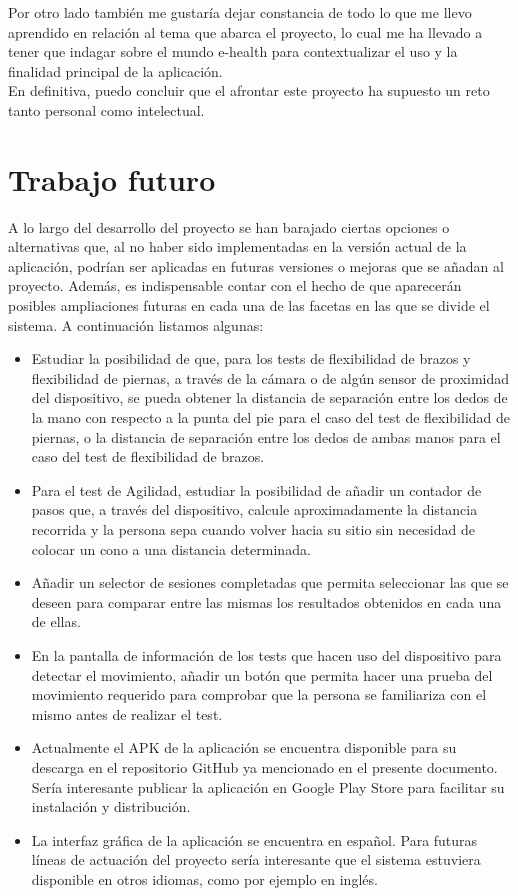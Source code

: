 Por otro lado también me gustaría dejar constancia de todo lo que me llevo aprendido en relación al tema que abarca el proyecto, lo cual me ha llevado a tener que indagar sobre el mundo e-health para contextualizar el uso y la finalidad principal de la aplicación.\\

En definitiva, puedo concluir que el afrontar este proyecto ha supuesto un reto tanto personal como intelectual.

\section{Trabajo futuro}

A lo largo del desarrollo del proyecto se han barajado ciertas opciones o alternativas que, al no haber sido implementadas en la versión actual de la aplicación, podrían ser aplicadas en futuras versiones o mejoras que se añadan al proyecto. Además, es indispensable contar con el hecho de que aparecerán posibles ampliaciones futuras en cada una de las facetas en las que se divide el sistema. A continuación listamos algunas:

\begin{itemize}
\item Estudiar la posibilidad de que, para los tests de flexibilidad de brazos y flexibilidad de piernas, a través de la cámara o de algún sensor de proximidad del dispositivo, se pueda obtener la distancia de separación entre los dedos de la mano con respecto a la punta del pie para el caso del test de flexibilidad de piernas, o la distancia de separación entre los dedos de ambas manos para el caso del test de flexibilidad de brazos.
\item Para el test de Agilidad, estudiar la posibilidad de añadir un contador de pasos que, a través del dispositivo, calcule aproximadamente la distancia recorrida y la persona sepa cuando volver hacia su sitio sin necesidad de colocar un cono a una distancia determinada.
\item Añadir un selector de sesiones completadas que permita seleccionar las que se deseen para comparar entre las mismas los resultados obtenidos en cada una de ellas.
\item En la pantalla de información de los tests que hacen uso del dispositivo para detectar el movimiento, añadir un botón que permita hacer una prueba del movimiento requerido para comprobar que la persona se familiariza con el mismo antes de realizar el test.
\item Actualmente el APK de la aplicación se encuentra disponible para su descarga en el repositorio GitHub ya mencionado en el presente documento. Sería interesante publicar la aplicación en Google Play Store para facilitar su instalación y distribución.
\item La interfaz gráfica de la aplicación se encuentra en español. Para futuras líneas de actuación del proyecto sería interesante que el sistema estuviera disponible en otros idiomas, como por ejemplo en inglés.
\end{itemize}


